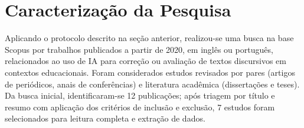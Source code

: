 \section{Caracterização da Pesquisa}

Aplicando o protocolo descrito na seção anterior, realizou-se uma busca na base Scopus por trabalhos publicados a partir de 2020, em inglês ou português, relacionados ao uso de IA para correção ou avaliação de textos discursivos em contextos educacionais. Foram considerados estudos revisados por pares (artigos de periódicos, anais de conferências) e literatura acadêmica (dissertações e teses). Da busca inicial, identificaram-se 12 publicações; após triagem por título e resumo com aplicação dos critérios de inclusão e exclusão, 7 estudos foram selecionados para leitura completa e extração de dados.

